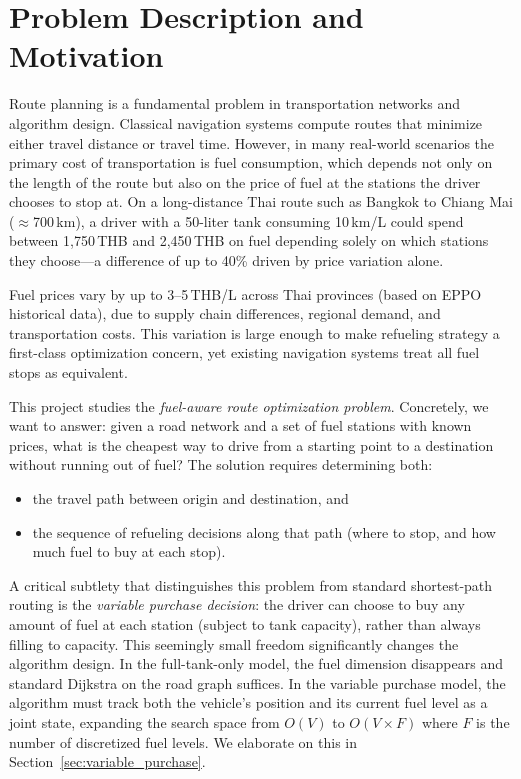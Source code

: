 \chapter{Problem Description and Motivation}

Route planning is a fundamental problem in transportation networks and algorithm design.
Classical navigation systems compute routes that minimize either travel distance or travel time.
However, in many real-world scenarios the primary cost of transportation is fuel consumption,
which depends not only on the length of the route but also on the price of fuel at the stations
the driver chooses to stop at.
On a long-distance Thai route such as Bangkok to Chiang Mai ($\approx$700\,km), a driver
with a 50-liter tank consuming 10\,km/L could spend between 1,750\,THB and 2,450\,THB
on fuel depending solely on which stations they choose---a difference of up to 40\% driven by
price variation alone.

Fuel prices vary by up to 3--5\,THB/L across Thai provinces (based on EPPO historical
data), due to supply chain differences, regional demand, and transportation costs.
This variation is large enough to make refueling strategy a first-class optimization concern,
yet existing navigation systems treat all fuel stops as equivalent.

This project studies the \textit{fuel-aware route optimization problem}.
Concretely, we want to answer: given a road network and a set of fuel stations with known
prices, what is the cheapest way to drive from a starting point to a destination without running
out of fuel?
The solution requires determining both:
\begin{itemize}
    \item the travel path between origin and destination, and
    \item the sequence of refueling decisions along that path (where to stop, and how much
          fuel to buy at each stop).
\end{itemize}

A critical subtlety that distinguishes this problem from standard shortest-path routing is the
\textit{variable purchase decision}: the driver can choose to buy any amount of fuel at each
station (subject to tank capacity), rather than always filling to capacity.
This seemingly small freedom significantly changes the algorithm design.
In the full-tank-only model, the fuel dimension disappears and standard Dijkstra on the road
graph suffices.
In the variable purchase model, the algorithm must track both the vehicle's position and its
current fuel level as a joint state, expanding the search space from $O(V)$ to $O(V \times F)$
where $F$ is the number of discretized fuel levels.
We elaborate on this in Section~\ref{sec:variable_purchase}.

